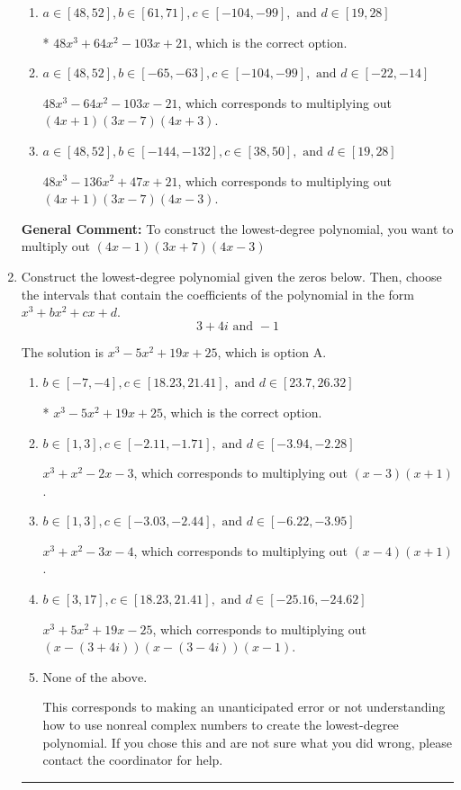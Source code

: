 \documentclass{extbook}[14pt]
\newcommand{\litem}[1]{\item #1

\rule{\textwidth}{0.4pt}}
\begin{document}
\begin{enumerate}
{\begin{enumerate}[label=\Alph*.]
$48x^{3} +88 x^{2} -65 x -21$, which corresponds to multiplying out $(4x + 1)(3x + 7)(4x -3)$.
\item \( a \in [48, 52], b \in [61, 71], c \in [-104, -99], \text{ and } d \in [19, 28] \)

* $48x^{3} +64 x^{2} -103 x + 21$, which is the correct option.
\item \( a \in [48, 52], b \in [-65, -63], c \in [-104, -99], \text{ and } d \in [-22, -14] \)

$48x^{3} -64 x^{2} -103 x -21$, which corresponds to multiplying out $(4x + 1)(3x -7)(4x + 3)$.
\item \( a \in [48, 52], b \in [-144, -132], c \in [38, 50], \text{ and } d \in [19, 28] \)

$48x^{3} -136 x^{2} +47 x + 21$, which corresponds to multiplying out $(4x + 1)(3x -7)(4x -3)$.
\end{enumerate}

\textbf{General Comment:} To construct the lowest-degree polynomial, you want to multiply out $(4x -1)(3x + 7)(4x -3)$
}
\litem{
Construct the lowest-degree polynomial given the zeros below. Then, choose the intervals that contain the coefficients of the polynomial in the form $x^3+bx^2+cx+d$.
\[ 3 + 4 i \text{ and } -1 \]

The solution is \( x^{3} -5 x^{2} +19 x + 25 \), which is option A.\begin{enumerate}[label=\Alph*.]
\item \( b \in [-7, -4], c \in [18.23, 21.41], \text{ and } d \in [23.7, 26.32] \)

* $x^{3} -5 x^{2} +19 x + 25$, which is the correct option.
\item \( b \in [1, 3], c \in [-2.11, -1.71], \text{ and } d \in [-3.94, -2.28] \)

$x^{3} + x^{2} -2 x -3$, which corresponds to multiplying out $(x -3)(x + 1)$.
\item \( b \in [1, 3], c \in [-3.03, -2.44], \text{ and } d \in [-6.22, -3.95] \)

$x^{3} + x^{2} -3 x -4$, which corresponds to multiplying out $(x -4)(x + 1)$.
\item \( b \in [3, 17], c \in [18.23, 21.41], \text{ and } d \in [-25.16, -24.62] \)

$x^{3} +5 x^{2} +19 x -25$, which corresponds to multiplying out $(x-(3 + 4 i))(x-(3 - 4 i))(x -1)$.
\item \( \text{None of the above.} \)

This corresponds to making an unanticipated error or not understanding how to use nonreal complex numbers to create the lowest-degree polynomial. If you chose this and are not sure what you did wrong, please contact the coordinator for help.
\end{enumerate}

}
\end{enumerate}
\end{document}
